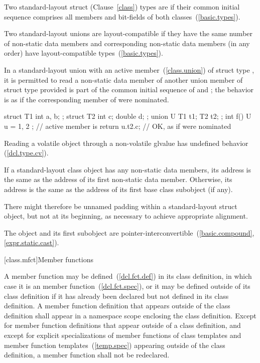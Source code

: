 \pnum
Two standard-layout struct (Clause~\ref{class}) types are
 if
their common initial sequence comprises all members and bit-fields of
both classes~(\ref{basic.types}).

\pnum
Two standard-layout unions are layout-compatible if they
have the same number of non-static data members and corresponding
non-static data members (in any order) have layout-compatible
types~(\ref{basic.types}).

\pnum
In a standard-layout union with an active member~(\ref{class.union})
of struct type , it is permitted to read a non-static
data member  of another union member of struct type 
provided  is part of the common initial sequence of  and ;
the behavior is as if the corresponding member of  were nominated.
\begin{example}
\begin{codeblock}
struct T1 { int a, b; };
struct T2 { int c; double d; };
union U { T1 t1; T2 t2; };
int f() {
  U u = { { 1, 2 } };   // active member is 
  return u.t2.c;        // OK, as if  were nominated
}
\end{codeblock}
\end{example}
\begin{note}
Reading a volatile object through a non-volatile glvalue has
undefined behavior (\ref{dcl.type.cv}).
\end{note}

\pnum
If a standard-layout class object has any non-static data members, its address
is the same as the address of its first non-static data member. Otherwise, its
address is the same as the address of its first base class subobject (if any).
\begin{note}
There might therefore be unnamed padding within a standard-layout struct object, but
not at its beginning, as necessary to achieve appropriate alignment.
\end{note}
\begin{note}
The object and its first subobject are
pointer-interconvertible~(\ref{basic.compound}, \ref{expr.static.cast}).
\end{note}

[class.mfct]{Member functions}%

\pnum
{}%
%
A member function may be defined~(\ref{dcl.fct.def}) in its class
definition, in which case it is an  member
function~(\ref{dcl.fct.spec}), or it may be defined outside of its class
definition if it has already been declared but not defined in its class
definition. A member function definition that appears outside of the
class definition shall appear in a namespace scope enclosing the class
definition. Except for member function definitions that appear outside
of a class definition, and except for explicit specializations of member
functions of class templates and member function
templates~(\ref{temp.spec}) appearing outside of the class definition, a
member function shall not be redeclared.

